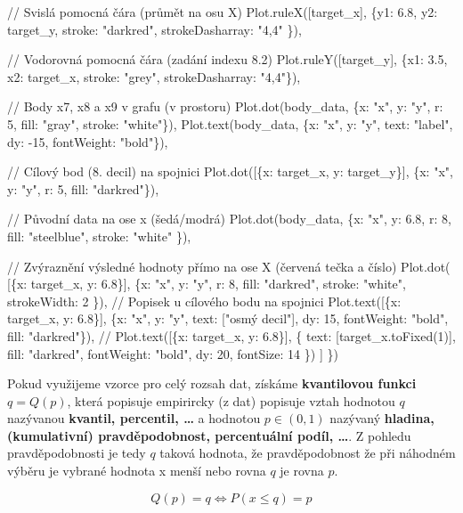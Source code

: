 \documentclass[
  czech,
  11pt,
  letterpaper,
  DIV=11,
  numbers=noendperiod]{scrreprt}
\newenvironment{Shaded}{\begin{snugshade}}{\end{snugshade}}
\newcommand{\NormalTok}[1]{\textcolor[rgb]{0.00,0.23,0.31}{#1}}
\begin{document}
\begin{tcolorbox}
\begin{Shaded}
\begin{Highlighting}[]
\NormalTok{    // Svislá pomocná čára (průmět na osu X)}
\NormalTok{    Plot.ruleX([target\_x], \{y1: 6.8, y2: target\_y, stroke: "darkred", strokeDasharray: "4,4" \}),}
    
\NormalTok{    // Vodorovná pomocná čára (zadání indexu 8.2)}
\NormalTok{    Plot.ruleY([target\_y], \{x1: 3.5, x2: target\_x, stroke: "grey", strokeDasharray: "4,4"\}),}
    
\NormalTok{    // Body x7, x8 a x9 v grafu (v prostoru)}
\NormalTok{    Plot.dot(body\_data, \{x: "x", y: "y", r: 5, fill: "gray", stroke: "white"\}),}
\NormalTok{    Plot.text(body\_data, \{x: "x", y: "y", text: "label", dy: {-}15, fontWeight: "bold"\}),}

\NormalTok{    // Cílový bod (8. decil) na spojnici}
\NormalTok{    Plot.dot([\{x: target\_x, y: target\_y\}], \{x: "x", y: "y", r: 5, fill: "darkred"\}),}
    
\NormalTok{    // Původní data na ose x (šedá/modrá)}
\NormalTok{    Plot.dot(body\_data, \{x: "x", y: 6.8, r: 8, fill: "steelblue", stroke: "white" \}),}
    
\NormalTok{    // Zvýraznění výsledné hodnoty přímo na ose X (červená tečka a číslo)}
\NormalTok{    Plot.dot( [\{x: target\_x, y: 6.8\}], \{x: "x", y: "y", r: 8, fill: "darkred", stroke: "white", strokeWidth: 2 \}),}
\NormalTok{    // Popisek u cílového bodu na spojnici }
\NormalTok{    Plot.text([\{x: target\_x, y: 6.8\}], \{x: "x", y: "y", text: ["osmý decil"], dy: 15, fontWeight: "bold", fill: "darkred"\}),}
\NormalTok{    // Plot.text([\{x: target\_x, y: 6.8\}], \{ text: [target\_x.toFixed(1)], fill: "darkred", fontWeight: "bold", dy: 20, fontSize: 14 \})}
\NormalTok{  ]}
\NormalTok{\})}
\end{Highlighting}
\end{Shaded}

\end{tcolorbox}

Pokud využijeme vzorce pro celý rozsah dat, získáme \textbf{kvantilovou
funkci} \(q = Q(p)\), která popisuje empirircky (z dat) popisuje vztah
hodnotou \textbf{\(q\)} nazývanou \textbf{kvantil, percentil, \ldots{}}
a hodnotou \textbf{\(p\in(0,1)\)} nazývaný \textbf{hladina,
(kumulativní) pravděpodobnost, percentuální podíl, \ldots{}}. Z pohledu
pravděpodobnosti je tedy \(q\) taková hodnota, že pravděpodobnost že při
náhodném výběru je vybrané hodnota x menší nebo rovna \(q\) je rovna
\(p\).

\[ Q(p)=q \Longleftrightarrow P(x\leq q)=p\]
\end{document}

